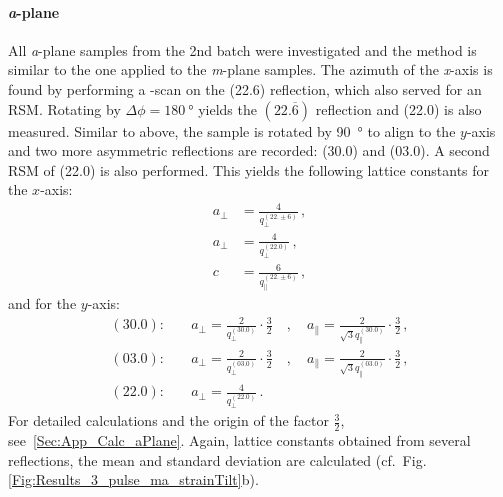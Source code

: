 \paragraph{\textit{a}-plane}
    All \textit{a}-plane samples from the 2nd batch were investigated and the method is similar to the one applied to the \textit{m}-plane samples.
    The azimuth of the \textit{x}-axis is found by performing a \textphi-scan on the (22.6) reflection, which also served for an \gls{RSM}.
    Rotating by $\Delta\phi=\qty{180}{\degree}$ yields the $(22.\overline{6})$ reflection and (22.0) is also measured.
    Similar to above, the sample is rotated by \qty{90}{\degree} to align to the $y$-axis and two more asymmetric reflections are recorded: (30.0) and (03.0).
    A second \gls{RSM} of (22.0) is also performed.
    This yields the following lattice constants for the $x$-axis:
    \begin{align}
        a_\perp &= \frac{4}{q_\perp^{(22.\pm6)}} \,,\\
        a_\perp &= \frac{4}{q_\perp^{(22.0)}}\,,\\
        c &= \frac{6}{q_\parallel^{(22.\pm6)}} \,,
    \end{align}
    and for the $y$-axis:
    \begin{align}
        (30.0):&\quad
            a_\perp = \frac{2}{q_\perp^{(30.0)}}\cdot\frac{3}{2}
            \quad,\quad
            a_\parallel = \frac{2}{\sqrt{3}q_\parallel^{(30.0)}}\cdot\frac{3}{2}\,,\\
        (03.0):&\quad
            a_\perp = \frac{2}{q_\perp^{(03.0)}}\cdot\frac{3}{2}
            \quad,\quad
            a_\parallel = \frac{2}{\sqrt{3}q_\parallel^{(03.0)}}\cdot\frac{3}{2}\,,\\
        (22.0):&\quad
            a_\perp = \frac{4}{q_\perp^{(22.0)}}\,.
    \end{align}
    For detailed calculations and the origin of the factor $\frac{3}{2}$, see\ \ref{Sec:App_Calc_aPlane}.
    Again, lattice constants obtained from several reflections, the mean and standard deviation are calculated (cf.\ Fig.\,\ref{Fig:Results_3_pulse_ma_strainTilt}b).

